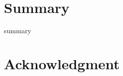 \documentclass[a4paper,12pt]{article}
\newcommand{\RI}[1]{\textcolor{blue}{#1}}
\begin{document}
\section{Summary}
\label{sec:sum}

summary

\section{Acknowledgment} 

\end{document}
